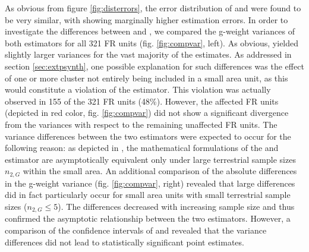 As obvious from figure \ref{fig:disterrors}, the error distribution of \psmall{} and \extpsynth{} were found to be very similar, with \psmall{} showing marginally higher estimation errors. In order to investigate the differences between \psmall{} and \extpsynth{}, we compared the g-weight variances of both estimators for all 321 FR units (fig. \ref{fig:compvar}, left). As obvious, \psmall{} yielded slightly larger variances for the vast majority of the estimates. As addressed in section \ref{sec:extpsynth}, one possible explanation for such differences was the effect of one or more cluster not entirely being included in a small area unit, as this would constitute a violation of the \extpsynth{} estimator. This violation was actually observed in 155 of the 321 FR units (48\%). However, the affected FR units (depicted in red color, fig. \ref{fig:compvar}) did not show a significant divergence from the \psmall{} variances with respect to the remaining unaffected FR units. The variance differences between the two estimators were expected to occur for the following reason: as depicted in \citet[pp.17--18]{mandallaz2016}, the mathematical formulations of the \psmall{} and \extpsynth{} estimator are asymptotically equivalent only under large terrestrial sample sizes $n_{2,G}$ within the small area. An additional comparison of the absolute differences in the g-weight variance (fig. \ref{fig:compvar}, right) revealed that large differences did in fact particularly occur for small area units with small terrestrial sample sizes ($n_{2,G} \leq 5$). The differences decreased with increasing sample size and thus confirmed the asymptotic relationship between the two estimators. However, a comparison of the confidence intervals of \psmall{} and \extpsynth{} revealed that the variance differences did not lead to statistically significant point estimates.\par

